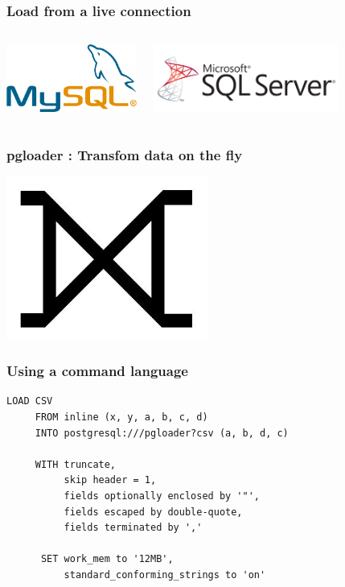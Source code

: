 \documentclass{beamer}
\begin{document}
\begin{frame}
  \frametitle{Load from a live connection}

  \vfill
  
  \begin{columns}[c]
    \begin{center}
      \includegraphics[height=6em]{mysql.png}
    \end{center}
    \begin{center}
      \includegraphics[height=6em]{mssql.png}
    \end{center}
  \end{columns}
\end{frame}

\begin{frame}
  \frametitle{pgloader : Transfom data on the fly}


  \begin{center}
    \includegraphics[height=2.1in]{huge-full-outer-join.jpg}
  \end{center}
\end{frame}


\begin{frame}[fragile]
  \frametitle{Using a command language}

  \begin{verbatim}
LOAD CSV
     FROM inline (x, y, a, b, c, d)
     INTO postgresql:///pgloader?csv (a, b, d, c)

     WITH truncate,
          skip header = 1,
          fields optionally enclosed by '"',
          fields escaped by double-quote,
          fields terminated by ','

      SET work_mem to '12MB',
          standard_conforming_strings to 'on'
  \end{verbatim}
\end{frame}
\end{document}
